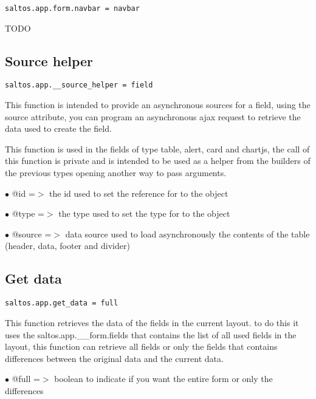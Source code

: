 \documentclass[a4paper]{book}
\begin{document}
\begin{lstlisting}
saltos.app.form.navbar = navbar
\end{lstlisting}

TODO

\hypertarget{toc387}{}
\subsection{Source helper}

\begin{lstlisting}
saltos.app.__source_helper = field
\end{lstlisting}

This function is intended to provide an asynchronous sources for a field, using the source attribute,
you can program an asynchronous ajax request to retrieve the data used to create the field.

This function is used in the fields of type table, alert, card and chartjs, the call of this function
is private and is intended to be used as a helper from the builders of the previous types opening
another way to pass arguments.

\begin{compactitem}
\item[\color{myblue}$\bullet$] @id     =$>$ the id used to set the reference for to the object
\item[\color{myblue}$\bullet$] @type   =$>$ the type used to set the type for to the object
\item[\color{myblue}$\bullet$] @source =$>$ data source used to load asynchronously the contents of the table (header, data,
           footer and divider)
\end{compactitem}

\hypertarget{toc388}{}
\subsection{Get data}

\begin{lstlisting}
saltos.app.get_data = full
\end{lstlisting}

This function retrieves the data of the fields in the current layout. to do this it uses
the saltos.app.\_\_form.fields that contains the list of all used fields in the layout, this
function can retrieve all fields or only the fields that contains differences between the
original data and the current data.

\begin{compactitem}
\item[\color{myblue}$\bullet$] @full =$>$ boolean to indicate if you want the entire form or only the differences
\end{compactitem}
\end{document}

